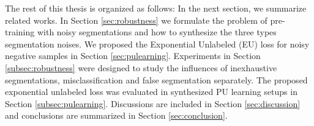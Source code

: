
The rest of this thesis is organized as follows:
In the next section, we summarize related works.
In Section \ref{sec:robustness} we formulate the problem of pre-training with noisy segmentations and how to synthesize the three types segmentation noises.
We proposed the Exponential Unlabeled (EU) loss for noisy negative samples in Section \ref{sec:pulearning}.
Experiments in Section \ref{subsec:robustness} were designed to study the influences of inexhaustive segmentations, misclassification and false segmentation separately.
The proposed exponential unlabeled loss was evaluated in synthesized PU learning setups in Section \ref{subsec:pulearning}.
Discussions are included in Section \ref{sec:discussion} and conclusions are summarized in Section \ref{sec:conclusion}.
